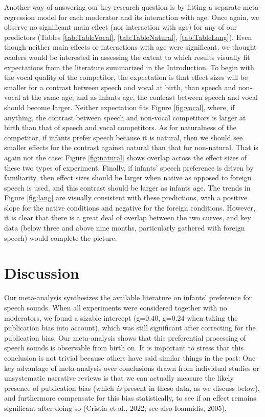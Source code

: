 \documentclass[
  man,mask,floatsintext]{apa6}
\begin{document}
Another way of answering our key research question is by fitting a separate meta-regression model for each moderator and its interaction with age. Once again, we observe no significant main effect (nor interaction with age) for any of our predictors (Tables \ref{tab:TableVocal}, \ref{tab:TableNatural}, \ref{tab:TableLang}). Even though neither main effects or interactions with age were significant, we thought readers would be interested in assessing the extent to which results visually fit expectations from the literature summarized in the Introduction. To begin with the vocal quality of the competitor, the expectation is that effect sizes will be smaller for a contrast between speech and vocal at birth, than speech and non-vocal at the same age; and as infants age, the contrast between speech and vocal should become larger. Neither expectation fits Figure \ref{fig:vocal}, where, if anything, the contrast between speech and non-vocal competitors is larger at birth than that of speech and vocal competitors. As for naturalness of the competitor, if infants prefer speech because it is natural, then we should see smaller effects for the contrast against natural than that for non-natural. That is again not the case: Figure \ref{fig:natural} shows overlap across the effect sizes of these two types of experiment. Finally, if infants' speech preference is driven by familiarity, then effect sizes should be larger when native as opposed to foreign speech is used, and this contrast should be larger as infants age. The trends in Figure \ref{fig:lang} are visually consistent with these predictions, with a positive slope for the native conditions and negative for the foreign conditions. However, it is clear that there is a great deal of overlap between the two curves, and key data (below three and above nine months, particularly gathered with foreign speech) would complete the picture.

\hypertarget{discussion}{%
\section{Discussion}\label{discussion}}

Our meta-analysis synthesizes the available literature on infants' preference for speech sounds. When all experiments were considered together with no moderators, we found a sizable intercept (g=0.40, g=0.24 when taking the publication bias into account), which was still significant after correcting for the publication bias. Our meta-analysis shows that this preferential processing of speech sounds is observable from birth on. It is important to stress that this conclusion is not trivial because others have said similar things in the past: One key advantage of meta-analysis over conclusions drawn from individual studies or unsystematic narrative reviews is that we can actually measure the likely presence of publication bias (which \emph{is} present in these data, as we discuss below), and furthermore compensate for this bias statistically, to see if an effect remains significant after doing so (Cristia et al., 2022; see also Ioannidis, 2005).
\end{document}
